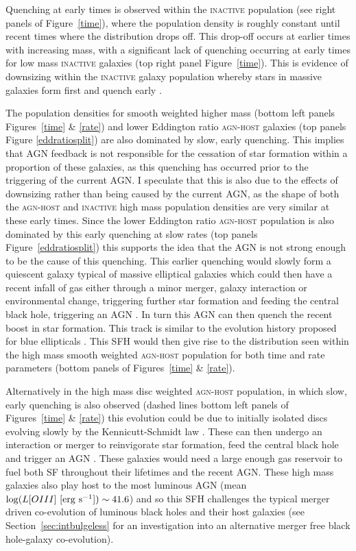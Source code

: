 Quenching at early times is observed within the \textsc{inactive} population (see right panels of Figure~\ref{time}), where the population density is roughly constant until recent times where the distribution drops off.  This drop-off occurs at earlier times with increasing mass, with a significant lack of quenching occurring at early times for low mass \textsc{inactive} galaxies (top right panel Figure~\ref{time}). This is evidence of downsizing within the \textsc{inactive} galaxy population whereby stars in massive galaxies form first and quench early \citep{Cowie96, Thomas10}. 

The population densities for smooth weighted higher mass (bottom left panels Figures~\ref{time} \& \ref{rate}) and lower Eddington ratio \textsc{agn-host} galaxies (top panels Figure \ref{eddratiosplit}) are also dominated by slow, early quenching. This implies that AGN feedback is not responsible for the cessation of star formation within a proportion of these galaxies, as this quenching has occurred prior to the triggering of the current AGN. I speculate that this is also due to the effects of downsizing rather than being caused by the current AGN, as the shape of both the \textsc{agn-host} and \textsc{inactive} high mass population densities are very similar at these early times. Since the lower Eddington ratio \textsc{agn-host} population is also dominated by this early quenching at slow rates (top panels Figure~\ref{eddratiosplit}) this supports the idea that the AGN is not strong enough to be the cause of this quenching.  This earlier quenching would slowly form a quiescent galaxy typical of massive elliptical galaxies which could then have a recent infall of gas either through a minor merger, galaxy interaction or environmental change, triggering further star formation and feeding the central black hole, triggering an AGN \citep{kaviraj14b}. In turn this AGN can then quench the recent boost in star formation. This track is similar to the evolution history proposed for blue ellipticals \citep[][and detected in the top panel of Figure~\ref{blue_c}]{Kaviraj13, McIntosh14, Haines15}. This SFH would then give rise to the distribution seen within the high mass smooth weighted \textsc{agn-host} population for both time and rate parameters (bottom panels of Figures~\ref{time} \& \ref{rate}).

Alternatively in the high mass disc weighted \textsc{agn-host} population, in which slow, early quenching is also observed (dashed lines bottom left panels of Figures~\ref{time} \& \ref{rate}) this evolution could be due to initially isolated discs evolving slowly by the Kennicutt-Schmidt law \citep{schmidt59, kennicutt97}. These can then undergo an interaction or merger to reinvigorate star formation, feed the central black hole and trigger an AGN \citep{Varela04, emsellem15}. These galaxies would need a large enough gas reservoir to fuel both SF throughout their lifetimes and the recent AGN. These high mass galaxies also play host to the most luminous AGN (mean $\log (L[OIII] ~[\rm{erg}~s^{-1}]) \sim 41.6$) and so this SFH challenges the typical merger driven co-evolution of luminous black holes and their host galaxies (see Section~\ref{sec:intbulgeless} for an investigation into an alternative merger free black hole-galaxy co-evolution). 

